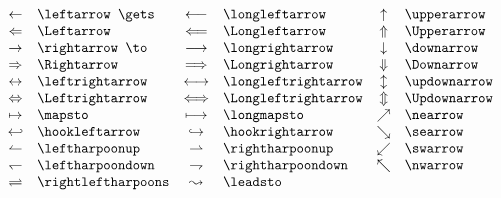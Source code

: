 \documentclass{article}
\begin{document}
    \begin{math}
        \begin{array}{clclcl}
            \leftarrow & \verb=\leftarrow \gets= & \longleftarrow & \verb=\longleftarrow= & \uparrow & \verb|\upperarrow| \\
            \Leftarrow & \verb=\Leftarrow= & \Longleftarrow & \verb=\Longleftarrow= & \Uparrow & \verb|\Upperarrow| \\
            \rightarrow & \verb=\rightarrow \to= & \longrightarrow & \verb=\longrightarrow= & \downarrow & \verb|\downarrow| \\
            \Rightarrow & \verb=\Rightarrow= & \Longrightarrow & \verb=\Longrightarrow= & \Downarrow & \verb|\Downarrow| \\
            \leftrightarrow & \verb=\leftrightarrow= & \longleftrightarrow & \verb=\longleftrightarrow= & \updownarrow & \verb|\updownarrow| \\
            \Leftrightarrow & \verb=\Leftrightarrow= & \Longleftrightarrow & \verb=\Longleftrightarrow= & \Updownarrow & \verb|\Updownarrow| \\
            \mapsto & \verb=\mapsto= & \longmapsto & \verb=\longmapsto= & \nearrow & \verb|\nearrow| \\
            \hookleftarrow & \verb=\hookleftarrow= & \hookrightarrow & \verb=\hookrightarrow= & \searrow & \verb|\searrow| \\
            \leftharpoonup & \verb=\leftharpoonup= & \rightharpoonup & \verb=\rightharpoonup= & \swarrow & \verb|\swarrow| \\
            \leftharpoondown& \verb=\leftharpoondown= & \rightharpoondown & \verb=\rightharpoondown= & \nwarrow & \verb|\nwarrow| \\
            \rightleftharpoons& \verb=\rightleftharpoons= & \leadsto & \verb=\leadsto= \\
        \end{array}
    \end{math}
\end{document}
